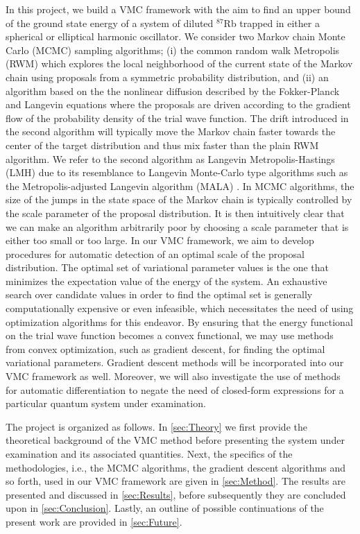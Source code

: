 In this project, we build a VMC framework with the aim to find an upper bound of the ground state energy of a system of diluted $^{87}$Rb trapped in either a spherical or elliptical harmonic oscillator. We consider two Markov chain Monte Carlo (MCMC) sampling algorithms; (i) the common random walk Metropolis (RWM) which explores the local neighborhood of the current state of the Markov chain using proposals from a symmetric probability distribution, and (ii) an algorithm based on the the nonlinear diffusion described by the Fokker-Planck and Langevin equations where the proposals are driven according to the gradient flow of the probability density of the trial wave function. The drift introduced in the second algorithm will typically move the Markov chain faster towards the center of the target distribution and thus mix faster than the plain RWM algorithm. We refer to the second algorithm as Langevin Metropolis-Hastings (LMH) due to its resemblance to Langevin Monte-Carlo type algorithms such as the Metropolis-adjusted Langevin algorithm (MALA) \citep{MALA}. In MCMC algorithms, the size of the jumps in the state space of the Markov chain is typically controlled by the scale parameter of the proposal distribution. It is then intuitively clear that we can make an algorithm arbitrarily poor by choosing a scale parameter that is either too small or too large. In our VMC framework, we aim to develop procedures for automatic detection of an optimal scale of the proposal distribution. The optimal set of variational parameter values is the one that minimizes the expectation value of the energy of the system. An exhaustive search over candidate values in order to find the optimal set is generally computationally expensive or even infeasible, which necessitates the need of using optimization algorithms for this endeavor. By ensuring that the energy functional on the trial wave function becomes a convex functional, we may use methods from convex optimization, such as gradient descent, for finding the optimal variational parameters. Gradient descent methods will be incorporated into our VMC framework as well. Moreover, we will also investigate the use of methods for automatic differentiation to negate the need of closed-form expressions for a particular quantum system under examination. 

The project is organized as follows. In \autoref{sec:Theory} we first provide the theoretical background of the VMC method before presenting the system under examination and its associated quantities. Next, the specifics of the methodologies, i.e., the MCMC algorithms, the gradient descent algorithms and so forth, used in our VMC framework are given in \autoref{sec:Method}. The results are presented and discussed in \autoref{sec:Results}, before subsequently they are concluded upon in \autoref{sec:Conclusion}. Lastly, an outline of possible continuations of the present work are provided in \autoref{sec:Future}.


